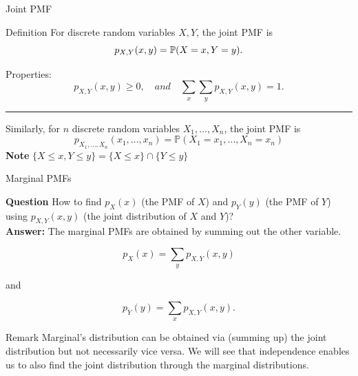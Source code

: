\begin{frame}{Joint PMF}
\begin{keybox}{Definition}
For discrete random variables \(X,Y\), the joint PMF is
\[
p_{X,Y}(x,y)
=
\mathbb{P}(X=x,Y=y).
\]
\end{keybox}

Properties:
\[
p_{X,Y}(x,y)\ge0, \quad and \quad \sum_x\sum_y p_{X,Y}(x,y)=1.
\]
\vspace{2mm}
\hrule
\vspace{2mm}
Similarly, for $n$ discrete random variables $X_1,\dots, X_n$, the joint PMF is
\begin{equation*}
    p_{X_1,\dots, X_n}(x_1,\dots, x_n)= \mathbb{P}(X_1=x_1, \dots ,X_n=x_n)
\end{equation*}
\textbf{Note} $\{X\leq x, Y\leq y\} = \{X\leq x\} \cap \{Y\leq y\}$

\end{frame}



\begin{frame}{Marginal PMFs}

\textbf{Question} How to find $p_X(x)$ (the PMF of $X$) and $p_Y(y)$ (the PMF of $Y$) using $p_{X,Y}(x,y)$ (the joint distribution of $X$ and $Y$)?
\vspace{1mm}
\\
\textbf{Answer: }The marginal PMFs are obtained by summing out the other variable.

\vspace{0.25cm}

\[
{
p_X(x)
=
\sum_y p_{X,Y}(x,y)
}
\]

and

\[
{
p_Y(y)
=
\sum_x p_{X,Y}(x,y).
}
\]

\begin{keybox}{Remark}
Marginal's distribution can be obtained via (summing up) the joint distribution but not necessarily vice versa. We will see that independence enables us to also find the joint distribution through the marginal distributions.
\end{keybox}
 
\end{frame}




 











